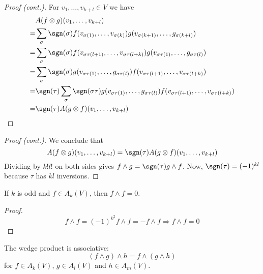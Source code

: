 \begin{frame}
  \begin{proof}[Proof (cont.)]
    For $v_1, \dots, v_{k+l} \in V$ we have
    \begin{align*}
      \phantom{=}&
      A(f \otimes g)(v_1, \dots, v_{k+l}) \\
      =&
      \sum_{\sigma} \sgn(\sigma)
      f(v_{\sigma(1)}, \dots, v_{\sigma(k)})
      g(v_{\sigma(k+1)}, \dots, g_{\sigma(k+l)}) \\
      =&
      \sum_{\sigma} \sgn(\sigma)
      f(v_{\sigma\tau(l+1)}, \dots, v_{\sigma\tau(l+k)})
      g(v_{\sigma\tau(1)}, \dots, g_{\sigma\tau(l)})
      \\
      =&
      \sum_{\sigma} \sgn(\sigma)
      g(v_{\sigma\tau(1)}, \dots, g_{\sigma\tau(l)})
      f(v_{\sigma\tau(l+1)}, \dots, v_{\sigma\tau(l+k)})
      \\
      =&
      \sgn(\tau)\sum_{\sigma} \sgn(\sigma\tau)
      g(v_{\sigma\tau(1)}, \dots, g_{\sigma\tau(l)}) 
      f(v_{\sigma\tau(l+1)}, \dots, v_{\sigma\tau(l+k)})
      \\
      =&
      \sgn(\tau) A(g \otimes f)(v_1, \dots, v_{k+l})
    \end{align*}
  \end{proof}
\end{frame}
\begin{frame}
  \begin{proof}[Proof (cont.)]
    We conclude that
    \begin{displaymath}
      A(f \otimes g)(v_1, \dots, v_{k+l}) 
      =
      \sgn(\tau) A(g \otimes f)(v_1, \dots, v_{k+l})
    \end{displaymath}
    Dividing by $k!l!$ on both sides gives $f \wedge g = \sgn(\tau) g \wedge
    f$.
    Now, $\sgn(\tau) = (-1)^{kl}$ because $\tau$ has $kl$ inversions.
  \end{proof}
  \begin{cor}
    If $k$ is odd and $f \in A_k(V)$, then $f \wedge f = 0$.
  \end{cor}
  \begin{proof}
    \begin{displaymath}
      f \wedge f = (-1)^{k^2} f \wedge f = - f \wedge f
      \Rightarrow f \wedge f = 0
    \end{displaymath}
  \end{proof}
\end{frame}
\begin{frame}
  \begin{prop}
    The wedge product is associative:
    \begin{displaymath}
      (f \wedge g) \wedge h = f \wedge (g \wedge h)
    \end{displaymath}
    for $f \in A_k(V)$, $g \in A_l(V)$ and $h \in A_m(V)$.
  \end{prop}
\end{frame}
